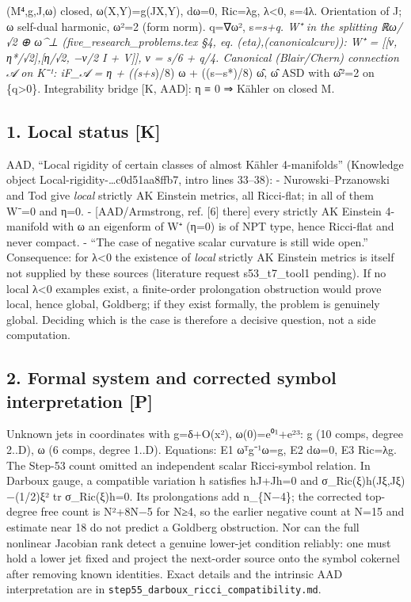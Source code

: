 \documentclass[
  10pt,
]{report}
\begin{document}
(M⁴,g,J,ω) closed, ω(X,Y)=g(JX,Y), dω=0, Ric=λg, λ\textless0, s=4λ.
Orientation of J; ω self-dual harmonic, \textbar ω\textbar²=2 (form
norm). q=\textbar∇ω\textbar², s\emph{=s+q. W⁺ in the splitting ℝω/√2 ⊕
ω\^{}⊥ (five\_research\_problems.tex §4, eq. (eta),(canonicalcurv)): W⁺
= {[}{[}ν, η*/√2{]},{[}η/√2, −ν/2 I + V{]}{]}, ν = s/6 + q/4. Canonical
(Blair/Chern) connection 𝒜 on K⁻¹: iF\_𝒜 = η + ((s+s})/8) ω + ((s−s*)/8)
ω̂, ω̂ ASD with \textbar ω̂\textbar²=2 on \{q\textgreater0\}. Integrability
bridge {[}K, AAD{]}: η ≡ 0 ⇒ Kähler on closed M.

\hypertarget{local-status-k}{%
\subsection{1. Local status {[}K{]}}\label{local-status-k}}

AAD, ``Local rigidity of certain classes of almost Kähler 4-manifolds''
(Knowledge object Local-rigidity-\ldots c0d51aa8ffb7, intro lines
33--38): - Nurowski--Przanowski and Tod give \emph{local} strictly AK
Einstein metrics, all Ricci-flat; in all of them W⁻=0 and η=0. -
{[}AAD/Armstrong, ref. {[}6{]} there{]} every strictly AK Einstein
4-manifold with ω an eigenform of W⁺ (η=0) is of NPT type, hence
Ricci-flat and never compact. - ``The case of negative scalar curvature
is still wide open.'' Consequence: for λ\textless0 the existence of
\emph{local} strictly AK Einstein metrics is itself not supplied by
these sources (literature request s53\_t7\_tool1 pending). If no local
λ\textless0 examples exist, a finite-order prolongation obstruction
would prove local, hence global, Goldberg; if they exist formally, the
problem is genuinely global. Deciding which is the case is therefore a
decisive question, not a side computation.

\hypertarget{formal-system-and-corrected-symbol-interpretation-p}{%
\subsection{2. Formal system and corrected symbol interpretation
{[}P{]}}\label{formal-system-and-corrected-symbol-interpretation-p}}

Unknown jets in coordinates with g=δ+O(\textbar x\textbar²),
ω(0)=e⁰¹+e²³: g (10 comps, degree 2..D), ω (6 comps, degree 1..D).
Equations: E1 ωᵀg⁻¹ω=g, E2 dω=0, E3 Ric=λg. The Step-53 count omitted an
independent scalar Ricci-symbol relation. In Darboux gauge, a compatible
variation h satisfies hJ+Jh=0 and
σ\_Ric(ξ)h(Jξ,Jξ)−(1/2)\textbar ξ\textbar² tr σ\_Ric(ξ)h=0. Its
prolongations add n\_\{N−4\}; the corrected top-degree free count is
N²+8N−5 for N≥4, so the earlier negative count at N=15 and estimate near
18 do not predict a Goldberg obstruction. Nor can the full nonlinear
Jacobian rank detect a genuine lower-jet condition reliably: one must
hold a lower jet fixed and project the next-order source onto the symbol
cokernel after removing known identities. Exact details and the
intrinsic AAD interpretation are in
\texttt{step55\_darboux\_ricci\_compatibility.md}.
\end{document}
